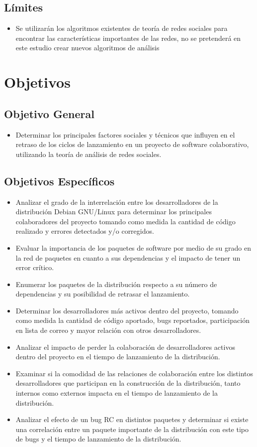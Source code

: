 \documentclass[12pt,titlepage]{report}
\begin{document}
\section*{Límites}
\begin{itemize}
\item Se utilizarán los algoritmos existentes de teoría de redes
  sociales para encontrar las características importantes de las
  redes, no se pretenderá en este estudio crear nuevos algoritmos de
  análisis
\end{itemize}

\chapter{Objetivos}
\section*{Objetivo General}
\begin{itemize}
\item Determinar los principales factores sociales y técnicos que
  influyen en el retraso de los ciclos de lanzamiento en un proyecto
  de software colaborativo, utilizando la teoría de análisis de redes
  sociales.
\end{itemize}

\section*{Objetivos Específicos}
\begin{itemize}
\item Analizar el grado de la interrelación entre los desarrolladores
  de la distribución Debian GNU/Linux para determinar los principales
  colaboradores del proyecto tomando como medida la cantidad de código
  realizado y errores detectados y/o corregidos.
\item Evaluar la importancia de los paquetes de software por medio de
  su grado en la red de paquetes en cuanto a sus dependencias y el
  impacto de tener un error crítico.
\item Enumerar los paquetes de la distribución respecto a su número de
  dependencias y su posibilidad de retrasar el lanzamiento.
\item Determinar los desarrolladores más activos dentro del proyecto,
  tomando como medida la cantidad de código aportado, bugs reportados,
  participación en lista de correo y mayor relación con otros
  desarrolladores.
\item Analizar el impacto de perder la colaboración de desarrolladores
  activos dentro del proyecto en el tiempo de lanzamiento de la
  distribución.
\item Examinar si la comodidad de las relaciones de colaboración entre
  los distintos desarrolladores que participan en la construcción de
  la distribución, tanto internos como externos impacta en el tiempo
  de lanzamiento de la distribución.
\item Analizar el efecto de un bug RC en distintos paquetes y
  determinar si existe una correlación entre un paquete importante de
  la distribución con este tipo de bugs y el tiempo de lanzamiento de
  la distribución.
\end{itemize}
\end{document}
